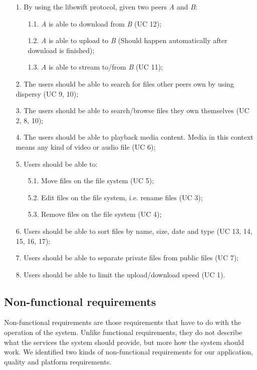 \begin{itemize}
\item[1.] By using the libswift protocol, given two peers \textit{A} and \textit{B}:
	\begin{itemize}
	\item[1.1.] \textit{A} is able to download from \textit{B} (UC 12);
	\item[1.2.] \textit{A} is able to upload to \textit{B} (Should happen automatically after download is finished);
	\item[1.3.] \textit{A} is able to stream to/from \textit{B} (UC 11);
	\end{itemize}
\item[2.] The users should be able to search for files other peers own by using dispersy (UC 9, 10);
\item[3.] The users should be able to search/browse files they own themselves (UC 2, 8, 10);
\item[4.] The users should be able to playback media content. 
		  Media in this context means any kind of video or audio file (UC 6);
\item[5.] Users should be able to:
	\begin{itemize}
	\item[5.1.] Move files on the file system (UC 5);
	\item[5.2.] Edit files on the file system, i.e. rename files (UC 3);	
	\item[5.3.] Remove files on the file system (UC 4);
	
	\end{itemize}
\item[6.] Users should be able to sort files by name, size, date and type (UC 13, 14, 15, 16, 17); 
\item[7.] Users should be able to separate private files from public files (UC 7);
\item[8.] Users should be able to limit the upload/download speed (UC 1). 
\end{itemize}

\subsection{Non-functional requirements}
Non-functional requirements are those requirements that have to do with the operation of the system. 
Unlike functional requirements, they do not describe what the services the system should provide, 
but more how the system should work. We identified two kinds of non-functional requirements for our application, 
quality and platform requirements.

